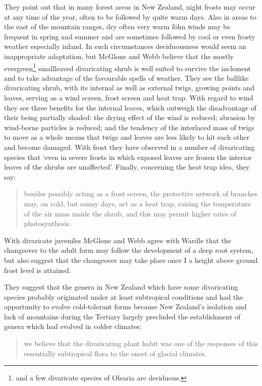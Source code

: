 They point out that in many forest areas in New Zealand, night frosts may occur at any time of the year, often to be followed by quite warm days.
Also in areas to the east of the mountain ranges, dry often very warm föhn winds may be frequent in spring and summer and are sometimes followed by cool or even frosty weather especially inland.
In such circumstances deciduousness would seem an inappropriate adaptation, but McGlone and Webb believe that the mostly evergreen\footnote{ and a few divaricate species of Olearia are deciduous.} smallleaved divaricating shrub is well suited to survive the inclement and to take advantage of the favourable spells of weather.
They see the balllike divaricating shrub, with its internal as well as external twigs, growing points and leaves, serving as a wind screen, frost screen and heat trap.
With regard to wind they see three benefits for the internal leaves, which outweigh the disadvantage of their being partially shaded: the drying effect of the wind is reduced; abrasion by wind-borne particles is reduced; and the tendency of the interlaced mass of twigs to move as a whole means that twigs and leaves are less likely to hit each other and become damaged.
With frost they have observed in a number of divaricating species that `even in severe frosts in which exposed leaves are frozen the interior leaves of the shrubs are unaffected'.
Finally, concerning the heat trap idea, they say:

\begin{quote}
	besides possibly acting as a frost screen, the protective network of branches may, on cold, but sunny days, act as a heat trap, raising the temperature of the air mass inside the shrub, and this may permit higher rates of photosynthesis.
\end{quote}

With divaricate juveniles McGlone and Webb agree with Wardle that the changeover to the adult form may follow the development of a deep root system, but also suggest that the changeover may take place once I a height above ground frost level is attained.

They suggest that the genera in New Zealand which have some divaricating species probably originated under at least subtropical conditions and had the opportunity to evolve cold-tolerant forms because New Zealand's isolation and lack of mountains during the Tertiary largely precluded the establishment of genera which had evolved in colder climates:

\begin{quote}
	we believe that the divaricating plant habit was one of the responses of this essentially subtropical flora to the onset of glacial climates.
\end{quote}

